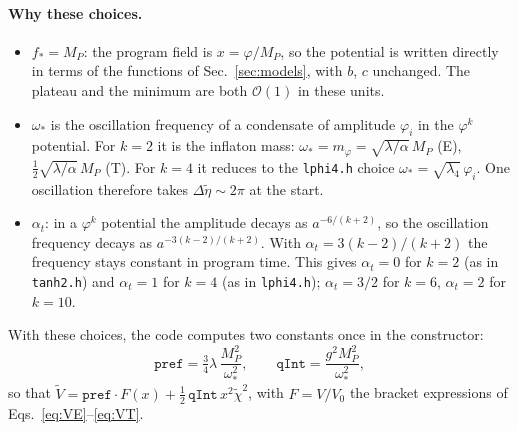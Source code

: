 \documentclass[11pt,a4paper]{article}
\newcommand{\MP}{M_P}
\newcommand{\aatt}{\alpha}
\newcommand{\at}{\alpha_t}
\newcommand{\file}[1]{\texttt{#1}}
\begin{document}
\paragraph{Why these choices.}
\begin{itemize}
\item $f_*=\MP$: the program field is $x=\varphi/\MP$, so the potential is written directly in terms of the functions of Sec.~\ref{sec:models}, with $b$, $c$ unchanged. The plateau and the minimum are both $\mathcal O(1)$ in these units.
\item $\omega_*$ is the oscillation frequency of a condensate of amplitude $\varphi_i$ in the $\varphi^k$ potential. For $k=2$ it is the inflaton mass: $\omega_*=m_\varphi=\sqrt{\lambda/\aatt}\,\MP$ (E), $\tfrac12\sqrt{\lambda/\aatt}\,\MP$ (T). For $k=4$ it reduces to the \file{lphi4.h} choice $\omega_*=\sqrt{\lambda_4}\,\varphi_i$. One oscillation therefore takes $\Delta\tilde\eta\sim2\pi$ at the start.
\item $\at$: in a $\varphi^k$ potential the amplitude decays as $a^{-6/(k+2)}$, so the oscillation frequency decays as $a^{-3(k-2)/(k+2)}$. With $\at=3(k-2)/(k+2)$ the frequency stays constant in program time. This gives $\at=0$ for $k=2$ (as in \file{tanh2.h}) and $\at=1$ for $k=4$ (as in \file{lphi4.h}); $\at=3/2$ for $k=6$, $\at=2$ for $k=10$.
\end{itemize}

With these choices, the code computes two constants once in the constructor:
\begin{equation}
\texttt{pref}=\tfrac34\lambda\,\frac{\MP^2}{\omega_*^2},\qquad
\texttt{qInt}=\frac{g^2\MP^2}{\omega_*^2},
\end{equation}
so that $\tilde V = \texttt{pref}\cdot F(x) + \tfrac12\,\texttt{qInt}\,x^2\tilde\chi^2$, with $F=V/V_0$ the bracket expressions of Eqs.~\eqref{eq:VE}--\eqref{eq:VT}.
\end{document}
